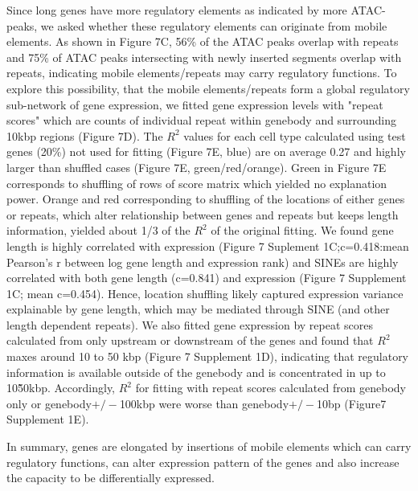 Since long genes have more regulatory elements as indicated by more ATAC-peaks, we asked whether these regulatory elements can originate from mobile elements. As shown in Figure 7C, 56\% of the ATAC peaks overlap with repeats and 75\% of ATAC peaks intersecting with newly inserted segments overlap with repeats, indicating mobile elements/repeats may carry regulatory functions. To explore this possibility, that the mobile elements/repeats form a global regulatory sub-network of gene expression, we fitted gene expression levels with "repeat scores" which are counts of individual repeat within genebody and surrounding 10kbp regions (Figure 7D).  The $R^2$ values for each cell type calculated using test genes (20\%) not used for fitting (Figure 7E, blue) are on average 0.27 and highly larger than shuffled cases (Figure 7E, green/red/orange). Green in Figure 7E corresponds to shuffling of rows of score matrix which yielded no explanation power. Orange and red corresponding to shuffling of the locations of either genes or repeats, which alter relationship between genes and repeats but keeps length information, yielded about 1/3 of the $R^2$ of the original fitting. We found gene length is highly correlated with expression (Figure 7 Suplement 1C;c=0.418:mean Pearson's r between log gene length and expression rank) and SINEs are highly correlated with both gene length (c=0.841) and expression (Figure 7 Supplement 1C; mean c=0.454). Hence, location shuffling likely captured expression variance explainable by gene length, which may be mediated through SINE (and other length dependent repeats). We also fitted gene expression by repeat scores calculated from only upstream or downstream of the genes and found that $R^2$ maxes around 10 to 50 kbp (Figure 7 Supplement 1D), indicating that regulatory information is available outside of the genebody and is concentrated in up to 10\~50kbp. Accordingly, $R^2$ for fitting with repeat scores calculated from genebody only or genebody$+/-$100kbp were worse than genebody$+/-$10bp (Figure7 Supplement 1E). 

In summary, genes are elongated by insertions of mobile elements which can carry regulatory functions, can alter expression pattern of the genes and also increase the capacity to be differentially expressed. 


